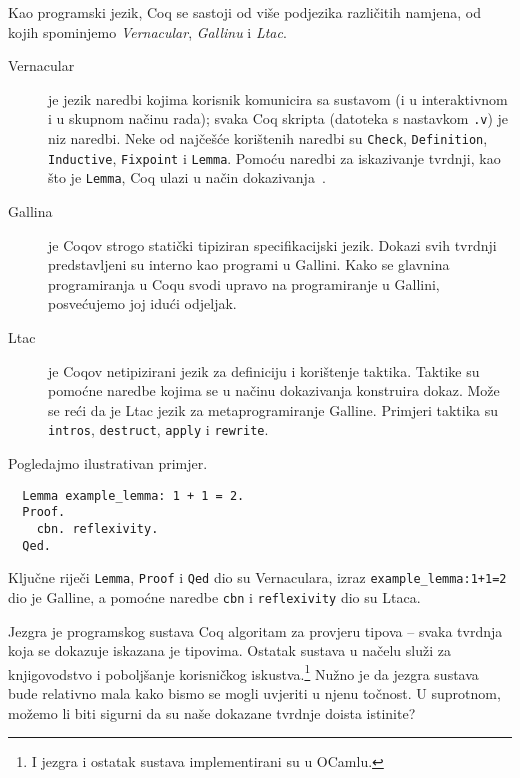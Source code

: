 Kao programski jezik, Coq se sastoji od više podjezika različitih namjena, od kojih spominjemo \textit{Vernacular}, \textit{Gallinu} i \textit{Ltac}.
\begin{description}
\item[Vernacular]  je jezik naredbi kojima korisnik komunicira sa sustavom (i u interaktivnom i u skupnom načinu rada);
  svaka Coq skripta (datoteka s nastavkom \texttt{.v}) je niz naredbi.
  Neke od najčešće korištenih naredbi su \texttt{Check}, \texttt{Definition}, \texttt{Inductive}, \texttt{Fixpoint} i \texttt{Lemma}.
  Pomoću naredbi za iskazivanje tvrdnji, kao što je \texttt{Lemma}, Coq ulazi u način dokazivanja~.
\item[Gallina] je Coqov strogo statički tipiziran specifikacijski jezik.
  Dokazi svih tvrdnji predstavljeni su interno kao programi u Gallini.
  Kako se glavnina programiranja u Coqu svodi upravo na programiranje u Gallini, posvećujemo joj idući odjeljak.
\item[Ltac] je Coqov netipizirani jezik za definiciju i korištenje taktika.
  Taktike su pomoćne naredbe kojima se u načinu dokazivanja konstruira dokaz.
  Može se reći da je Ltac jezik za metaprogramiranje Galline.
  Primjeri taktika su \texttt{intros}, \texttt{destruct}, \texttt{apply} i \texttt{rewrite}.
\end{description} %
\noindent Pogledajmo ilustrativan primjer.
\begin{verbatim}
  Lemma example_lemma: 1 + 1 = 2.
  Proof.
    cbn. reflexivity.
  Qed.
\end{verbatim}
\noindent Ključne riječi \texttt{Lemma}, \texttt{Proof} i \texttt{Qed} dio su Vernaculara,
izraz \texttt{example\_lemma:1+1=2} dio je Galline,
a pomoćne naredbe \texttt{cbn} i \texttt{reflexivity} dio su Ltaca.

Jezgra je programskog sustava Coq algoritam za provjeru tipova  -- svaka tvrdnja koja se dokazuje iskazana je tipovima.
Ostatak sustava u načelu služi za knjigovodstvo i poboljšanje korisničkog iskustva.\footnote{I jezgra i ostatak sustava implementirani su u OCamlu.}
Nužno je da jezgra sustava bude relativno mala kako bismo se mogli uvjeriti u njenu točnost.
U suprotnom, možemo li biti sigurni da su naše dokazane tvrdnje doista istinite?

